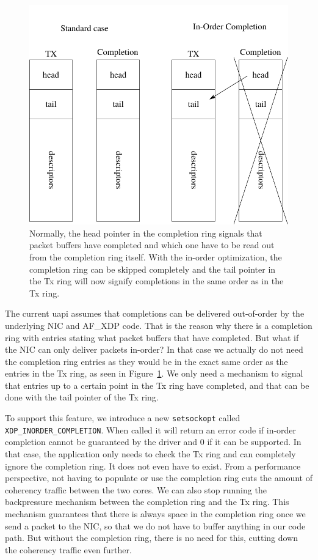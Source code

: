 \documentclass[9pt,numbers,reprint]{sigplanconf}
\begin{document}
\begin{figure}[t]
\includegraphics[width=.48\textwidth]{in_order.pdf}
\caption{Normally, the head pointer in the completion ring signals
  that packet buffers have completed and which one have to be read out
from the completion ring itself. With the in-order optimization, the
completion ring can be skipped completely and the tail pointer in the
Tx ring will now signify completions in the same order as in the Tx ring.}
\label{fig:in_order}
\end{figure}

The current uapi assumes that completions can be delivered
out-of-order by the underlying NIC and AF\_XDP code. That is the reason
why there is a completion ring with entries stating what packet
buffers that have completed. But what if the NIC can only deliver
packets in-order? In that case we actually do not need the completion
ring entries as they would be in the exact same order as the entries
in the Tx ring, as seen in Figure~\ref{fig:in_order}. We only need a
mechanism to signal that entries up to a certain point in the Tx ring
have completed, and that can be done with the tail pointer of the Tx
ring.

To support this feature, we introduce a new {\tt setsockopt} called
{\tt XDP\_INORDER\_COMPLETION}. When called it will return an error
code if in-order completion cannot be guaranteed by the driver and 0
if it can be supported. In that case, the application only needs to
check the Tx ring and can completely ignore the completion ring. It
does not even have to exist. From a performance perspective, not
having to populate or use the completion ring cuts the amount of
coherency traffic between the two cores. We can also stop running the
backpressure mechanism between the completion ring and the Tx
ring. This mechanism guarantees that there is always space in the
completion ring once we send a packet to the NIC, so that we do not
have to buffer anything in our code path. But without the completion
ring, there is no need for this, cutting down the coherency traffic
even further.
\end{document}
